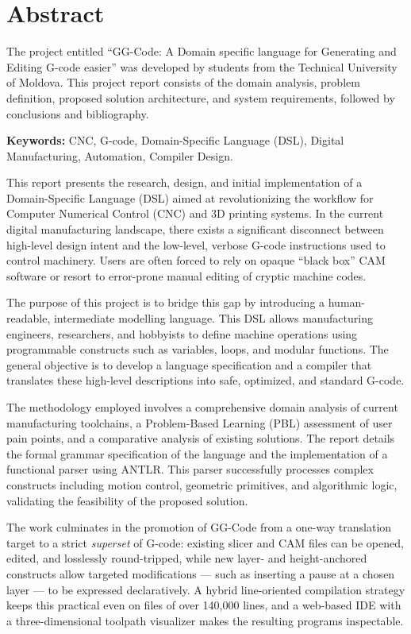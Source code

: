 \chapter*{Abstract}

The project entitled ``GG-Code: A Domain specific language for Generating and Editing G-code easier'' was developed by students from the Technical University of Moldova. This project report consists of the domain analysis, problem definition, proposed solution architecture, and system requirements, followed by conclusions and bibliography.

\textbf{Keywords: } CNC, G-code, Domain-Specific Language (DSL), Digital Manufacturing, Automation, Compiler Design.

This report presents the research, design, and initial implementation of a Domain-Specific Language (DSL) aimed at revolutionizing the workflow for Computer Numerical Control (CNC) and 3D printing systems. In the current digital manufacturing landscape, there exists a significant disconnect between high-level design intent and the low-level, verbose G-code instructions used to control machinery. Users are often forced to rely on opaque ``black box'' CAM software or resort to error-prone manual editing of cryptic machine codes.

The purpose of this project is to bridge this gap by introducing a human-readable, intermediate modelling language. This DSL allows manufacturing engineers, researchers, and hobbyists to define machine operations using programmable constructs such as variables, loops, and modular functions. The general objective is to develop a language specification and a compiler that translates these high-level descriptions into safe, optimized, and standard G-code.

The methodology employed involves a comprehensive domain analysis of current manufacturing toolchains, a Problem-Based Learning (PBL) assessment of user pain points, and a comparative analysis of existing solutions. The report details the formal grammar specification of the language and the implementation of a functional parser using ANTLR. This parser successfully processes complex constructs including motion control, geometric primitives, and algorithmic logic, validating the feasibility of the proposed solution.

The work culminates in the promotion of GG-Code from a one-way translation target to a strict \emph{superset} of G-code: existing slicer and CAM files can be opened, edited, and losslessly round-tripped, while new layer- and height-anchored constructs allow targeted modifications --- such as inserting a pause at a chosen layer --- to be expressed declaratively. A hybrid line-oriented compilation strategy keeps this practical even on files of over 140{,}000 lines, and a web-based IDE with a three-dimensional toolpath visualizer makes the resulting programs inspectable.
